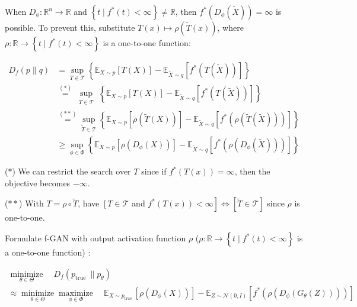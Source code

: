 \documentclass{report}
\begin{document}
\begin{concept}
    When $D_{\phi}: \mathbb{R}^{n} \rightarrow \mathbb{R}$ and $\left\{t \mid f^{*}(t)<\infty\right\} \neq \mathbb{R}$, then $f^{*}\left(D_{\phi}(\tilde{X})\right)=\infty$ is possible. To prevent this, substitute $T(x) \mapsto \rho(\tilde{T}(x))$, where $\rho: \mathbb{R} \rightarrow\left\{t \mid f^{*}(t)<\infty\right\}$ is a one-to-one function:

    $$
    \begin{aligned}
    D_{f}(p \| q) & =\sup _{T \in \mathcal{T}}\left\{\mathbb{E}_{X \sim p}[T(X)]-\mathbb{E}_{\tilde{X} \sim q}\left[f^{*}(T(\tilde{X}))\right]\right\} \\
    & \stackrel{(*)}{=} \sup _{\substack{T \in \mathcal{T}}}\left\{\mathbb{E}_{X \sim p}[T(X)]-\mathbb{E}_{\tilde{X} \sim q}\left[f^{*}(T(\tilde{X}))\right]\right\} \\
    & \stackrel{(* *)}{=} \sup _{\tilde{T} \in \mathcal{T}}\left\{\mathbb{E}_{X \sim p}[\rho(\tilde{T}(X))]-\mathbb{E}_{\tilde{X} \sim q}\left[f^{*}(\rho(\tilde{T}(\tilde{X})))\right]\right\} \\
    & \geq \sup _{\phi \in \Phi}\left\{\mathbb{E}_{X \sim p}\left[\rho\left(D_{\phi}(X)\right)\right]-\mathbb{E}_{\tilde{X} \sim q}\left[f^{*}\left(\rho\left(D_{\phi}(\tilde{X})\right)\right)\right]\right\}
    \end{aligned}
    $$

    ($*$) We can restrict the search over $T$ since if $f^{*}(T(x))=\infty$, then the objective becomes $-\infty$.

    ($**$) With $T=\rho \circ \tilde{T}$, have $\left[T \in \mathcal{T}\right.$ and $\left.f^{*}(T(x))<\infty\right] \Leftrightarrow[\tilde{T} \in \mathcal{T}]$ since $\rho$ is one-to-one.
\end{concept}

\begin{definition}
    Formulate f-GAN with output activation function $\rho$ ($\rho: \mathbb{R} \rightarrow\left\{t \mid f^{*}(t)<\infty\right\}$ is a one-to-one function) :

    $$
    \begin{gathered}
    \underset{\theta \in \Theta}{\operatorname{minimize}} \quad D_{f}\left(p_{\text {true }} \| p_{\theta}\right) \\
    \approx \underset{\theta \in \Theta}{\operatorname{minimize}} \underset{\phi \in \Phi}{\operatorname{maximize}} \quad \mathbb{E}_{X \sim p_{\text {true }}}\left[\rho\left(D_{\phi}(X)\right)\right]-\mathbb{E}_{Z \sim \mathcal{N}(0, I)}\left[f^{*}\left(\rho\left(D_{\phi}\left(G_{\theta}(Z)\right)\right)\right)\right]
    \end{gathered}
    $$
\end{definition}
\end{document}
